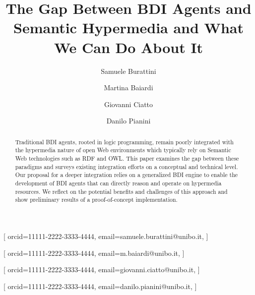 \documentclass[
]{ceurart}
\begin{document}


\title{The Gap Between BDI Agents and Semantic Hypermedia and What We Can Do About It}


\author[1]{Samuele Burattini}[%
orcid=11111-2222-3333-4444,
email=samuele.burattini@unibo.it,
]
\cormark[1]
\fnmark[1]

\author[1]{Martina Baiardi}[%
orcid=11111-2222-3333-4444,
email=m.baiardi@unibo.it,
]
\fnmark[1]

\author[1]{Giovanni Ciatto}[%
orcid=11111-2222-3333-4444,
email=giovanni.ciatto@unibo.it,
]


\author[1]{Danilo Pianini}[%
orcid=11111-2222-3333-4444,
email=danilo.pianini@unibo.it,
]



\address[1]{\disi, \unibo}



\begin{abstract}
  Traditional BDI agents, 
  rooted in logic programming, 
  remain poorly integrated with the hypermedia nature of open Web environments
  which typically rely on Semantic Web technologies such as RDF and OWL.
  This paper examines the gap between these paradigms and surveys existing integration efforts on a conceptual and technical level.
  Our proposal for a deeper integration relies on a generalized BDI engine to enable the development of BDI agents that can directly reason and operate on hypermedia resources.
  We reflect on the potential benefits and challenges of this approach and show preliminary results of a proof-of-concept implementation.
\end{abstract}
\end{document}
